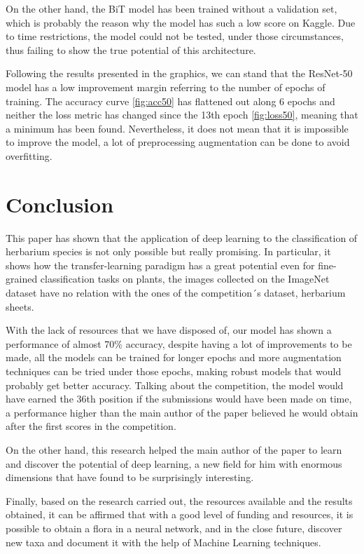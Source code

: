 \documentclass{article}
\begin{document}
On the other hand, the BiT model has been trained without a validation set, which is probably the reason why the model has such a low score on Kaggle. Due to time restrictions, the model could not be tested, under those circumstances, thus failing to show the true potential of this architecture.

Following the results presented in the graphics, we can stand that the ResNet-50 model has a low improvement margin referring to the number of epochs of training. The accuracy curve \ref{fig:acc50} has flattened out along 6 epochs and neither the loss metric has changed since the 13th epoch \ref{fig:loss50}, meaning that a minimum has been found. Nevertheless, it does not mean that it is impossible to improve the model, a lot of preprocessing augmentation can be done to avoid overfitting.

\section{Conclusion}

This paper has shown that the application of deep learning to the classification of herbarium species is not only possible but really promising. In particular, it shows how the transfer-learning paradigm has a great potential even for fine-grained classification tasks on plants, the images collected on the ImageNet dataset have no relation with the ones of the competition´s dataset, herbarium sheets. 

With the lack of resources that we have disposed of, our model has shown a performance of almost 70\% accuracy, despite having a lot of improvements to be made, all the models can be trained for longer epochs and more augmentation techniques can be tried under those epochs, making robust models that would probably get better accuracy. Talking about the competition, the model would have earned the 36th position if the submissions would have been made on time, a performance higher than the main author of the paper believed he would obtain after the first scores in the competition.

On the other hand, this research helped the main author of the paper to learn and discover the potential of deep learning, a new field for him with enormous dimensions that have found to be surprisingly interesting.

Finally, based on the research carried out, the resources available and the results obtained, it can be affirmed that with a good level of funding and resources, it is possible to obtain a flora in a neural network, and in the close future, discover new taxa and document it with the help of Machine Learning techniques.
\end{document}
